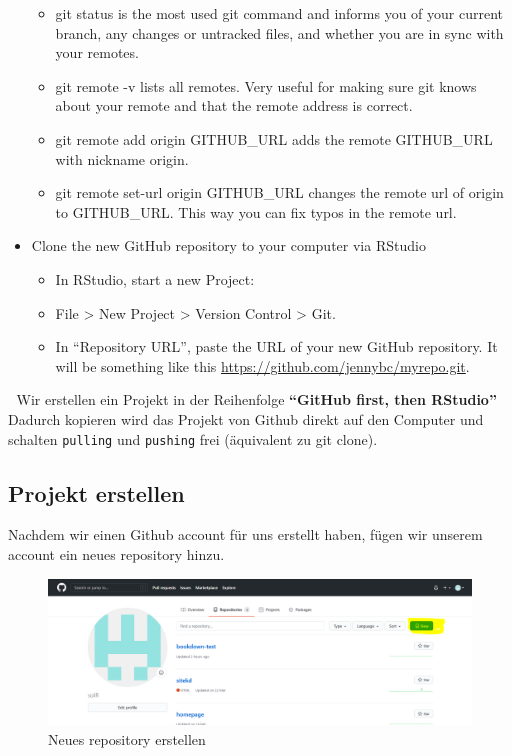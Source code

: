 \documentclass[
]{article}
\providecommand{\tightlist}{%
  \setlength{\itemsep}{0pt}\setlength{\parskip}{0pt}}
\begin{document}
\begin{itemize}
  \begin{itemize}
  \tightlist
  \item
    git status is the most used git command and informs you of your
    current branch, any changes or untracked files, and whether you
    are in sync with your remotes.
  \item
    git remote -v lists all remotes. Very useful for making sure git
    knows about your remote and that the remote address is correct.
  \item
    git remote add origin GITHUB\_URL adds the remote GITHUB\_URL with
    nickname origin.
  \item
    git remote set-url origin GITHUB\_URL changes the remote url of
    origin to GITHUB\_URL. This way you can fix typos in the remote
    url.
  \end{itemize}
\item
  Clone the new GitHub repository to your computer via RStudio

  \begin{itemize}
  \tightlist
  \item
    In RStudio, start a new Project:
  \item
    File \textgreater{} New Project \textgreater{} Version Control \textgreater{} Git.
  \item
    In ``Repository URL'', paste the URL of your new GitHub
    repository. It will be something like this
    \url{https://github.com/jennybc/myrepo.git}.
  \end{itemize}
\end{itemize}

🚨 Wir erstellen ein Projekt in der Reihenfolge \textbf{``GitHub first, then
RStudio''} Dadurch kopieren wird das Projekt von Github direkt auf den Computer und schalten \texttt{pulling} und \texttt{pushing} frei (äquivalent zu git clone).

\hypertarget{projekt-erstellen}{%
\subsection{Projekt erstellen}\label{projekt-erstellen}}

Nachdem wir einen Github account für uns erstellt haben, fügen wir unserem account ein neues repository hinzu.

\begin{figure}

{\centering \includegraphics[width=22.61in]{images/066} 

}

\caption{Neues repository erstellen}\label{fig:unnamed-chunk-293}
\end{figure}
\end{document}
